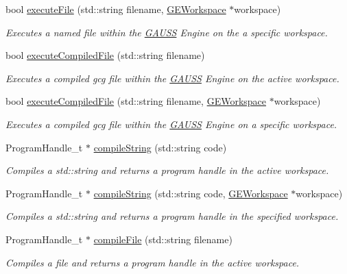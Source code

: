 \begin{DoxyCompactItemize}
bool \hyperlink{class_g_a_u_s_s_a7d4b858cf5909ffaf97dbf3d10bb753e}{execute\-File} (std\-::string filename, \hyperlink{class_g_e_workspace}{G\-E\-Workspace} $\ast$workspace)
\begin{DoxyCompactList}\small\item\em Executes a named file within the \hyperlink{class_g_a_u_s_s}{G\-A\-U\-S\-S} Engine on the a specific workspace. \end{DoxyCompactList}\item 
bool \hyperlink{class_g_a_u_s_s_ac2624100ec1467f7c7b0626973c7e1fc}{execute\-Compiled\-File} (std\-::string filename)
\begin{DoxyCompactList}\small\item\em Executes a compiled gcg file within the \hyperlink{class_g_a_u_s_s}{G\-A\-U\-S\-S} Engine on the active workspace. \end{DoxyCompactList}\item 
bool \hyperlink{class_g_a_u_s_s_a910fde00b8ff18303cae28aec3fbc447}{execute\-Compiled\-File} (std\-::string filename, \hyperlink{class_g_e_workspace}{G\-E\-Workspace} $\ast$workspace)
\begin{DoxyCompactList}\small\item\em Executes a compiled gcg file within the \hyperlink{class_g_a_u_s_s}{G\-A\-U\-S\-S} Engine on a specific workspace. \end{DoxyCompactList}\item 
Program\-Handle\-\_\-t $\ast$ \hyperlink{class_g_a_u_s_s_a3ecf1522874c8ae5aa8fb8173d515b73}{compile\-String} (std\-::string code)
\begin{DoxyCompactList}\small\item\em Compiles a std\-::string and returns a program handle in the active workspace. \end{DoxyCompactList}\item 
Program\-Handle\-\_\-t $\ast$ \hyperlink{class_g_a_u_s_s_a5707d1f8b1d7bbdba9364cccb40f165b}{compile\-String} (std\-::string code, \hyperlink{class_g_e_workspace}{G\-E\-Workspace} $\ast$workspace)
\begin{DoxyCompactList}\small\item\em Compiles a std\-::string and returns a program handle in the specified workspace. \end{DoxyCompactList}\item 
Program\-Handle\-\_\-t $\ast$ \hyperlink{class_g_a_u_s_s_a981bdafede1af555a73b9abe05333341}{compile\-File} (std\-::string filename)
\begin{DoxyCompactList}\small\item\em Compiles a file and returns a program handle in the active workspace. \end{DoxyCompactList}\item 

\end{DoxyCompactItemize}
